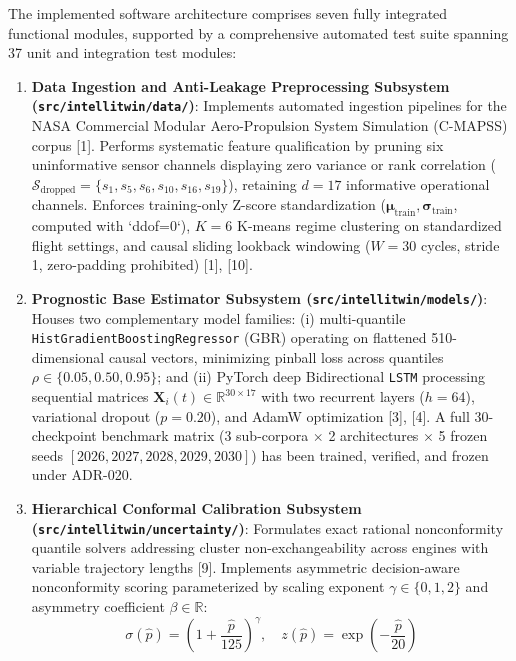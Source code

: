 \documentclass[12pt,a4paper]{article}
\begin{document}
The implemented software architecture comprises seven fully integrated functional modules, supported by a comprehensive automated test suite spanning 37 unit and integration test modules:
\begin{enumerate}
    \item \textbf{Data Ingestion and Anti-Leakage Preprocessing Subsystem (\texttt{src/intellitwin/data/})}: Implements automated ingestion pipelines for the NASA Commercial Modular Aero-Propulsion System Simulation (C-MAPSS) corpus [1]. Performs systematic feature qualification by pruning six uninformative sensor channels displaying zero variance or rank correlation ($\mathcal{S}_{\text{dropped}} = \{s_1, s_5, s_6, s_{10}, s_{16}, s_{19}\}$), retaining $d = 17$ informative operational channels. Enforces training-only Z-score standardization ($\boldsymbol{\mu}_{\text{train}}, \boldsymbol{\sigma}_{\text{train}}$, computed with `ddof=0`), $K = 6$ K-means regime clustering on standardized flight settings, and causal sliding lookback windowing ($W = 30$ cycles, stride 1, zero-padding prohibited) [1], [10].
    \item \textbf{Prognostic Base Estimator Subsystem (\texttt{src/intellitwin/models/})}: Houses two complementary model families: (i) multi-quantile \texttt{HistGradientBoostingRegressor} (GBR) operating on flattened 510-dimensional causal vectors, minimizing pinball loss across quantiles $\rho \in \{0.05, 0.50, 0.95\}$; and (ii) PyTorch deep Bidirectional \texttt{LSTM} processing sequential matrices $\mathbf{X}_i(t) \in \mathbb{R}^{30 \times 17}$ with two recurrent layers ($h = 64$), variational dropout ($p = 0.20$), and AdamW optimization [3], [4]. A full 30-checkpoint benchmark matrix (3 sub-corpora $\times$ 2 architectures $\times$ 5 frozen seeds $[2026, 2027, 2028, 2029, 2030]$) has been trained, verified, and frozen under ADR-020.
    \item \textbf{Hierarchical Conformal Calibration Subsystem (\texttt{src/intellitwin/uncertainty/})}: Formulates exact rational nonconformity quantile solvers addressing cluster non-exchangeability across engines with variable trajectory lengths [9]. Implements asymmetric decision-aware nonconformity scoring parameterized by scaling exponent $\gamma \in \{0, 1, 2\}$ and asymmetry coefficient $\beta \in \mathbb{R}$:
    \begin{equation}
    \sigma(\hat{p}) = \left(1 + \frac{\hat{p}}{125}\right)^\gamma, \quad z(\hat{p}) = \exp\left(-\frac{\hat{p}}{20}\right)
    \end{equation}
    \begin{equation}

\end{equation}
\end{enumerate}
\end{document}
